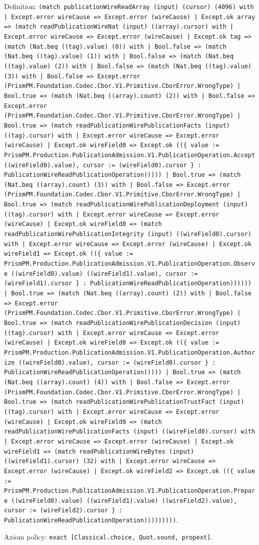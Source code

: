 \documentclass[11pt]{article}
\begin{document}
\noindent Definition: \texttt{(match publicationWireReadArray (input) (cursor) (4096) with | Except.error wireCause => Except.error (wireCause) | Except.ok array => (match readPublicationWireNat (input) ((array).cursor) with | Except.error wireCause => Except.error (wireCause) | Except.ok tag => (match (Nat.beq ((tag).value) (0)) with | Bool.false => (match (Nat.beq ((tag).value) (1)) with | Bool.false => (match (Nat.beq ((tag).value) (2)) with | Bool.false => (match (Nat.beq ((tag).value) (3)) with | Bool.false => Except.error (PrismPM.Foundation.Codec.Cbor.V1.Primitive.CborError.WrongType) | Bool.true => (match (Nat.beq ((array).count) (2)) with | Bool.false => Except.error (PrismPM.Foundation.Codec.Cbor.V1.Primitive.CborError.WrongType) | Bool.true => (match readPublicationWirePublicationFacts (input) ((tag).cursor) with | Except.error wireCause => Except.error (wireCause) | Except.ok wireField0 => Except.ok ((\{ value := PrismPM.Production.PublicationAdmission.V1.PublicationOperation.Accept ((wireField0).value), cursor := (wireField0).cursor \} : PublicationWireReadPublicationOperation))))) | Bool.true => (match (Nat.beq ((array).count) (3)) with | Bool.false => Except.error (PrismPM.Foundation.Codec.Cbor.V1.Primitive.CborError.WrongType) | Bool.true => (match readPublicationWirePublicationDeployment (input) ((tag).cursor) with | Except.error wireCause => Except.error (wireCause) | Except.ok wireField0 => (match readPublicationWirePublicationIntegrity (input) ((wireField0).cursor) with | Except.error wireCause => Except.error (wireCause) | Except.ok wireField1 => Except.ok ((\{ value := PrismPM.Production.PublicationAdmission.V1.PublicationOperation.Observe ((wireField0).value) ((wireField1).value), cursor := (wireField1).cursor \} : PublicationWireReadPublicationOperation)))))) | Bool.true => (match (Nat.beq ((array).count) (2)) with | Bool.false => Except.error (PrismPM.Foundation.Codec.Cbor.V1.Primitive.CborError.WrongType) | Bool.true => (match readPublicationWirePublicationDecision (input) ((tag).cursor) with | Except.error wireCause => Except.error (wireCause) | Except.ok wireField0 => Except.ok ((\{ value := PrismPM.Production.PublicationAdmission.V1.PublicationOperation.Authorize ((wireField0).value), cursor := (wireField0).cursor \} : PublicationWireReadPublicationOperation))))) | Bool.true => (match (Nat.beq ((array).count) (4)) with | Bool.false => Except.error (PrismPM.Foundation.Codec.Cbor.V1.Primitive.CborError.WrongType) | Bool.true => (match readPublicationWirePublicationTrustFact (input) ((tag).cursor) with | Except.error wireCause => Except.error (wireCause) | Except.ok wireField0 => (match readPublicationWirePublicationFacts (input) ((wireField0).cursor) with | Except.error wireCause => Except.error (wireCause) | Except.ok wireField1 => (match readPublicationWireBytes (input) ((wireField1).cursor) (32) with | Except.error wireCause => Except.error (wireCause) | Except.ok wireField2 => Except.ok ((\{ value := PrismPM.Production.PublicationAdmission.V1.PublicationOperation.Prepare ((wireField0).value) ((wireField1).value) ((wireField2).value), cursor := (wireField2).cursor \} : PublicationWireReadPublicationOperation)))))))))}.\par
\noindent Axiom policy: \texttt{exact [Classical.choice, Quot.sound, propext]}.\par
\end{document}
